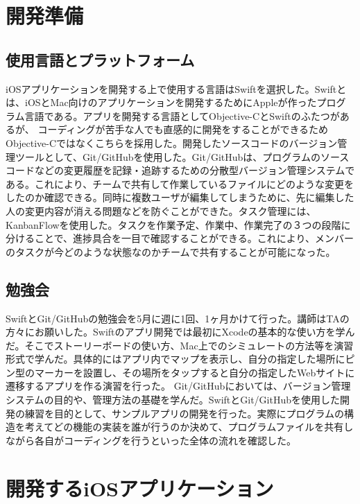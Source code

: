 \documentclass[openany,11pt,papersize]{jsbook}
\begin{document}
\chapter{開発準備}

\section{使用言語とプラットフォーム}

iOSアプリケーションを開発する上で使用する言語はSwiftを選択した。Swiftとは、iOSとMac向けのアプリケーションを開発するためにAppleが作ったプログラム言語である。アプリを開発する言語としてObjective-CとSwiftのふたつがあるが、
コーディングが苦手な人でも直感的に開発をすることができるためObjective-Cではなくこちらを採用した。開発したソースコードのバージョン管理ツールとして、Git/GitHubを使用した。Git/GitHubは、プログラムのソースコードなどの変更履歴を記録・追跡するための分散型バージョン管理システムである。これにより、チームで共有して作業しているファイルにどのような変更をしたのか確認できる。同時に複数ユーザが編集してしまうために、先に編集した人の変更内容が消える問題などを防ぐことができた。タスク管理には、KanbanFlowを使用した。タスクを作業予定、作業中、作業完了の３つの段階に分けることで、進捗具合を一目で確認することができる。これにより、メンバーのタスクが今どのような状態なのかチームで共有することが可能になった。

\section{勉強会}
SwiftとGit/GitHubの勉強会を5月に週に1回、1ヶ月かけて行った。講師はTAの方々にお願いした。Swiftのアプリ開発では最初にXcodeの基本的な使い方を学んだ。そこでストーリーボードの使い方、Mac上でのシミュレートの方法等を演習形式で学んだ。具体的にはアプリ内でマップを表示し、自分の指定した場所にピン型のマーカーを設置し、その場所をタップすると自分の指定したWebサイトに遷移するアプリを作る演習を行った。
Git/GitHubにおいては、バージョン管理システムの目的や、管理方法の基礎を学んだ。SwiftとGit/GitHubを使用した開発の練習を目的として、サンプルアプリの開発を行った。実際にプログラムの構造を考えてどの機能の実装を誰が行うのか決めて、プログラムファイルを共有しながら各自がコーディングを行うといった全体の流れを確認した。



\chapter{開発するiOSアプリケーション}
\end{document}

